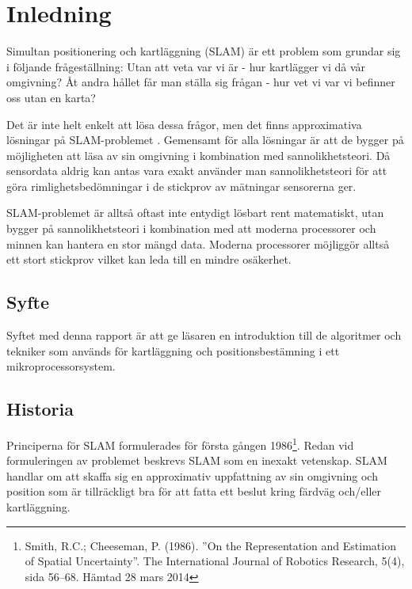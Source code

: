 \documentclass[a4paper,12pt,fleqn]{article}
\begin{document}
\addto\captionsswedish{\renewcommand{\contentsname}{Innehållsförteckning}}

\tableofcontents
\thispagestyle{fancy}
\newpage


\section{Inledning}

Simultan positionering och kartläggning (SLAM) är ett problem som grundar sig i följande frågeställning: Utan att veta var vi är - hur kartlägger vi då vår omgivning? Åt andra hållet får man ställa sig frågan - hur vet vi var vi befinner oss utan en karta?

Det är inte helt enkelt att lösa dessa frågor, men det finns approximativa lösningar på SLAM-problemet . Gemensamt för alla lösningar är att de bygger på möjligheten att läsa av sin omgivning i kombination med
sannolikhetsteori. Då sensordata aldrig kan antas vara exakt använder man sannolikhetsteori för att göra rimlighetsbedömningar i de stickprov av mätningar sensorerna ger.

SLAM-problemet är alltså oftast inte entydigt lösbart rent matematiskt, utan
bygger på sannolikhetsteori i kombination med att moderna processorer
och minnen kan hantera en stor mängd data. Moderna processorer möjliggör
alltså ett stort stickprov vilket kan leda till en mindre osäkerhet.

\subsection{Syfte}
Syftet med denna rapport är att ge läsaren en introduktion till de algoritmer och tekniker som används för kartläggning och positionsbestämning i ett mikroprocessorsystem.

\subsection{Historia}

Principerna för SLAM formulerades för första gången 1986\footnote{Smith, R.C.; Cheeseman, P. (1986).
''On the Representation and Estimation of Spatial Uncertainty''. The
International Journal of Robotics Research, 5(4), sida 56–68. Hämtad 28 mars 2014}. Redan vid formuleringen av problemet beskrevs SLAM som en inexakt vetenskap. SLAM handlar om att skaffa sig en approximativ uppfattning av sin omgivning och position som är tillräckligt bra för att fatta ett beslut kring färdväg och/eller kartläggning. 
\end{document}
